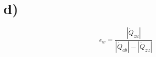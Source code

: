

\section*{d)}

\[
\epsilon_w = \frac{\left| \dot{Q}_{zu} \right|}{\left| \dot{Q}_{ab} \right| - \left| \dot{Q}_{zu} \right|}
\]